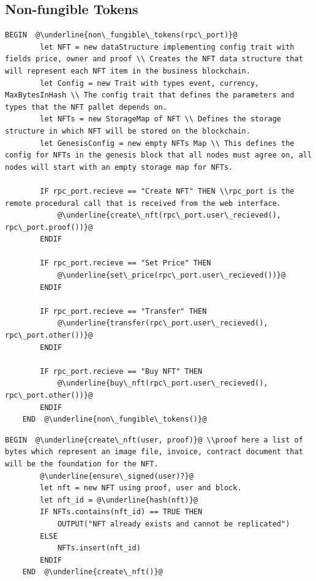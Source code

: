 \subsection{Non-fungible Tokens}
\begin{lstlisting}[caption=Non Fungible Tokens, escapechar=\@]
	BEGIN  @\underline{non\_fungible\_tokens(rpc\_port)}@
		let NFT = new dataStructure implementing config trait with fields price, owner and proof \\ Creates the NFT data structure that will represent each NFT item in the business blockchain.
		let Config = new Trait with types event, currency, MaxBytesInHash \\ The config trait that defines the parameters and types that the NFT pallet depends on.
		let NFTs = new StorageMap of NFT \\ Defines the storage structure in which NFT will be stored on the blockchain.
		let GenesisConfig = new empty NFTs Map \\ This defines the config for NFTs in the genesis block that all nodes must agree on, all nodes will start with an empty storage map for NFTs.
		
		IF rpc_port.recieve == "Create NFT" THEN \\rpc_port is the remote procedural call that is received from the web interface.
			@\underline{create\_nft(rpc\_port.user\_recieved(), rpc\_port.proof())}@
		ENDIF

		IF rpc_port.recieve == "Set Price" THEN
			@\underline{set\_price(rpc\_port.user\_recieved())}@
		ENDIF

		IF rpc_port.recieve == "Transfer" THEN
			@\underline{transfer(rpc\_port.user\_recieved(), rpc\_port.other())}@
		ENDIF

		IF rpc_port.recieve == "Buy NFT" THEN
			@\underline{buy\_nft(rpc\_port.user\_recieved(), rpc\_port.other())}@
		ENDIF
	END  @\underline{non\_fungible\_tokens()}@
\end{lstlisting}

\begin{lstlisting}[caption=Create NFT, escapechar=\@]
	BEGIN  @\underline{create\_nft(user, proof)}@ \\proof here a list of bytes which represent an image file, invoice, contract document that will be the foundation for the NFT.
		@\underline{ensure\_signed(user)?}@	
		let nft = new NFT using proof, user and block.
		let nft_id = @\underline{hash(nft)}@
		IF NFTs.contains(nft_id) == TRUE THEN
			OUTPUT("NFT already exists and cannot be replicated")
		ELSE
			NFTs.insert(nft_id)
		ENDIF
	END  @\underline{create\_nft()}@
\end{lstlisting}


